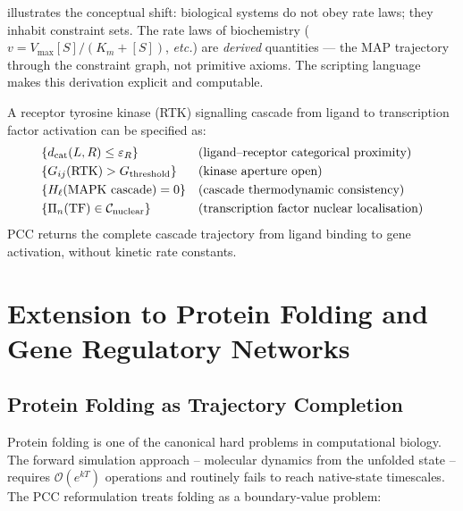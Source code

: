 \begin{remark}
 illustrates the conceptual shift: biological systems do
not obey rate laws; they inhabit constraint sets.  The rate laws of biochemistry
($v = V_\mathrm{max}[S]/(K_m+[S])$, \emph{etc.}) are \emph{derived}
quantities --- the MAP trajectory through the constraint graph, not primitive
axioms.  The scripting language makes this derivation explicit and computable.
\end{remark}

\begin{example}
\label{ex:signalling}
A receptor tyrosine kinase (RTK) signalling cascade from ligand to transcription
factor activation can be specified as:
\begin{align*}
    &\{d_{\mathrm{cat}}(L, R) \le \varepsilon_R\}
    &&\text{(ligand--receptor categorical proximity)} \\
    &\{G_{ij}(\text{RTK}) > G_\mathrm{threshold}\}
    &&\text{(kinase aperture open)} \\
    &\{H_\ell(\text{MAPK cascade}) = 0\}
    &&\text{(cascade thermodynamic consistency)} \\
    &\{\Pi_n(\text{TF}) \in \mathcal{C}_\mathrm{nuclear}\}
    &&\text{(transcription factor nuclear localisation)}
\end{align*}
PCC returns the complete cascade trajectory from ligand binding to gene
activation, without kinetic rate constants.
\end{example}

\section{Extension to Protein Folding and Gene Regulatory Networks}
\label{sec:grn-protein}

\subsection{Protein Folding as Trajectory Completion}

Protein folding is one of the canonical hard problems in computational biology.
The forward simulation approach -- molecular dynamics from the unfolded state --
requires $\mathcal{O}(e^{kT})$ operations and routinely fails to reach native-state
timescales.  The PCC reformulation treats folding as a boundary-value problem:

